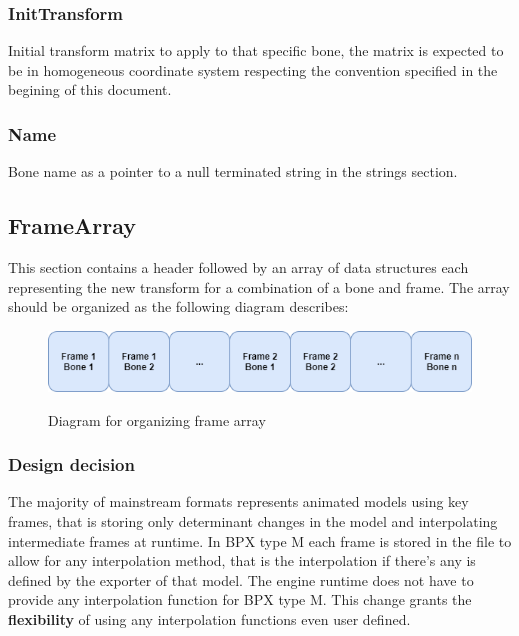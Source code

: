 \subsubsection{InitTransform}
Initial transform matrix to apply to that specific bone, the matrix is expected to be in homogeneous coordinate system \cite{HomogeneousCoordinates} respecting the convention specified in the begining of this document.

\subsubsection{Name}
Bone name as a pointer to a null terminated string in the strings section.

\subsection{FrameArray}
This section contains a header followed by an array of data structures each representing the new transform for a combination of a bone and frame.\newline
The array should be organized as the following diagram describes:
\begin{figure}[h!]
    \centering
    \includegraphics[scale=0.7]{Types/FrameArray_Diagram.png}
    \label{fig:FrameArray_Diagram}
    \caption{Diagram for organizing frame array}
\end{figure}

\subsubsection{Design decision}
The majority of mainstream formats represents animated models using key frames, that is storing only determinant changes in the model and interpolating intermediate frames at runtime. In BPX type M each frame is stored in the file to allow for any interpolation method, that is the interpolation if there's any is defined by the exporter of that model. The engine runtime does not have to provide any interpolation function for BPX type M.\newline
This change grants the \textbf{flexibility} of using any interpolation functions even user defined.

